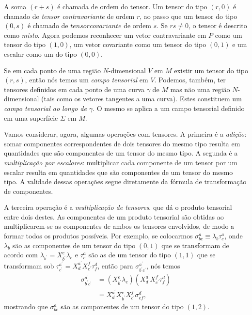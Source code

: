 A soma $(r+s)$ é chamada de ordem do tensor. Um tensor do tipo $(r,0)$ é chamado de \textit{tensor contravariante} de ordem $r$, ao passo que um tensor do tipo $(0,s)$ é chamado de $tensor covariante$ de ordem $s$. Se $rs\neq0$, o tensor é descrito como \textit{misto}. Agora podemos reconhecer um vetor contravariante em $P$ como um tensor do tipo $(1,0)$, um vetor covariante como um tensor do tipo $(0,1)$ e um escalar como um  do tipo $(0,0)$.

Se em cada ponto de uma região $N$-dimensional $V$ em $M$ existir um tensor do tipo $(r,s)$, então nós temos um \textit{campo tensorial} em $V$. Podemos, também, ter tensores definidos em cada ponto de uma curva $\gamma$ de $M$ mas não uma região $N$-dimensional (tais como os vetores tangentes a uma curva). Estes constituem um \textit{campo tensorial ao longo de $\gamma$}. O mesmo se aplica a um campo tensorial definido em uma superfície $\Sigma$ em $M$.

Vamos considerar, agora, algumas operações com tensores. A primeira é a \textit{adição}: somar componentes correspondentes de dois tensores do mesmo tipo resulta em quantidades que são componentes de um tensor do mesmo tipo. A segunda é a \textit{multiplicação por escalares}: multiplicar cada componente de um tensor por um escalar resulta em quantidades que são componentes de um tensor do mesmo tipo. A validade dessas operações segue diretamente da fórmula de transformação de componentes.

A terceira operação é a \textit{multiplicação de tensores}, que dá o produto tensorial entre dois destes. As componentes de um produto tensorial são obtidas ao multiplicarem-se as componentes de ambos os tensores envolvidos, de modo a formar todos os produtos possíveis. Por exemplo, se colocarmos $\sigma^a_{bc}\equiv\lambda_b\tau^a_c$, onde $\lambda_b$ são as componentes de um tensor do tipo $(0,1)$ que se transformam de acordo com $\lambda_{b^\prime}=X^e_{b^\prime}\lambda_e$ e $\tau^a_c$ são as de um tensor do tipo $(1,1)$ que se transformam sob $\tau^{a^\prime}_{c^\prime}=X^{a^\prime}_dX^f_{c^\prime}\tau^d_f$, então para $\sigma^{a^\prime}_{b^\prime c^\prime}$, nós temos
\[
\begin{aligned} \sigma_{b^{\prime} c^{\prime}}^{a^{\prime}} &=\left(X_{b^{\prime}}^{e} \lambda_{e}\right)\left(X_{d}^{a^{\prime}} X_{c^{\prime}}^{f} \tau_{f}^{d}\right) \\ &=X_{d}^{a^{\prime}} X_{b^{\prime}}^{e} X_{c^{\prime}}^{f} \sigma_{e f}^{d}  ,
\end{aligned}
\]
mostrando que $\sigma^a_{bc}$ são as componentes de um tensor do tipo $(1,2)$.

